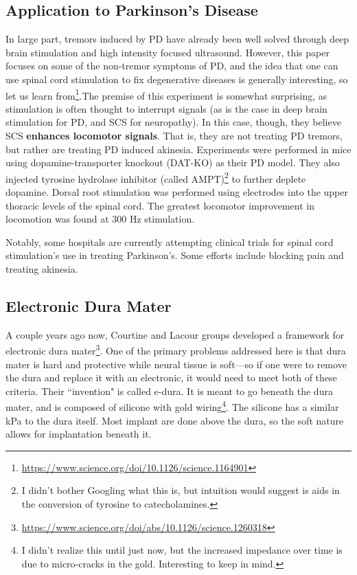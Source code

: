 \documentclass[12pt]{report}
\begin{document}
\subsection{Application to Parkinson's Disease}

In large part, tremors induced by PD have already been well solved through deep brain stimulation and high intensity focused ultrasound. However, this paper focuses on some of the non-tremor symptoms of PD, and the idea that one can use spinal cord stimulation to fix degenerative diseases is generally interesting, so let us learn from\footnote{\url{https://www.science.org/doi/10.1126/science.1164901}}.The premise of this experiment is somewhat surprising, as stimulation is often thought to interrupt signals (as is the case in deep brain stimulation for PD, and SCS for neuropathy). In this case, though, they believe SCS \textbf{enhances locomotor signals}. That is, they are not treating PD tremors, but rather are treating PD induced akinesia. Experiments were performed in mice using dopamine-transporter knockout (DAT-KO) as their PD model. They also injected tyrosine hydrolase inhibitor (called AMPT)\footnote{I didn't bother Googling what this is, but intuition would suggest is aids in the conversion of tyrosine to catecholamines.} to further deplete dopamine. Dorsal root stimulation was performed using electrodes into the upper thoracic levels of the spinal cord. The greatest locomotor improvement in locomotion was found at 300 Hz stimulation.\newline

Notably, some hospitals are currently attempting clinical trials for spinal cord stimulation's use in treating Parkinson's. Some efforts include blocking pain and treating akinesia. 

\subsection{Electronic Dura Mater}

A couple years ago now, Courtine and Lacour groups developed a framework for electronic dura mater\footnote{\url{https://www.science.org/doi/abs/10.1126/science.1260318}}. One of the primary problems addressed here is that dura mater is hard and protective while neural tissue is soft---so if one were to remove the dura and replace it with an electronic, it would need to meet both of these criteria. Their ``invention" is called e-dura. It is meant to go beneath the dura mater, and is composed of silicone with gold wiring\footnote{I didn't realize this until just now, but the increased impedance over time is due to micro-cracks in the gold. Interesting to keep in mind.}. The silicone has a similar kPa to the dura itself. Most implant are done above the dura, so the soft nature allows for implantation beneath it.\newline
\end{document}

